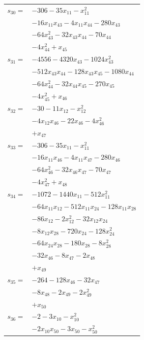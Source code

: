 \begin{longtable}{@{}r@{\;}l@{}}
\(s_{30}=\) & \(\displaystyle -306 -35x_{11} -x_{11}^{2}\) \\
 & \(\displaystyle -16x_{11}x_{43} -4x_{11}x_{44} -280x_{43}\) \\
 & \(\displaystyle -64x_{43}^{2} -32x_{43}x_{44} -70x_{44}\) \\
 & \(\displaystyle -4x_{44}^{2} +x_{45}\) \\[3pt]
\(s_{31}=\) & \(\displaystyle -4556 -4320x_{43} -1024x_{43}^{2}\) \\
 & \(\displaystyle -512x_{43}x_{44} -128x_{43}x_{45} -1080x_{44}\) \\
 & \(\displaystyle -64x_{44}^{2} -32x_{44}x_{45} -270x_{45}\) \\
 & \(\displaystyle -4x_{45}^{2} +x_{46}\) \\[3pt]
\(s_{32}=\) & \(\displaystyle -30 -11x_{12} -x_{12}^{2}\) \\
 & \(\displaystyle -4x_{12}x_{46} -22x_{46} -4x_{46}^{2}\) \\
 & \(\displaystyle +x_{47}\) \\[3pt]
\(s_{33}=\) & \(\displaystyle -306 -35x_{11} -x_{11}^{2}\) \\
 & \(\displaystyle -16x_{11}x_{46} -4x_{11}x_{47} -280x_{46}\) \\
 & \(\displaystyle -64x_{46}^{2} -32x_{46}x_{47} -70x_{47}\) \\
 & \(\displaystyle -4x_{47}^{2} +x_{48}\) \\[3pt]
\(s_{34}=\) & \(\displaystyle -1072 -1440x_{11} -512x_{11}^{2}\) \\
 & \(\displaystyle -64x_{11}x_{12} -512x_{11}x_{24} -128x_{11}x_{28}\) \\
 & \(\displaystyle -86x_{12} -2x_{12}^{2} -32x_{12}x_{24}\) \\
 & \(\displaystyle -8x_{12}x_{28} -720x_{24} -128x_{24}^{2}\) \\
 & \(\displaystyle -64x_{24}x_{28} -180x_{28} -8x_{28}^{2}\) \\
 & \(\displaystyle -32x_{46} -8x_{47} -2x_{48}\) \\
 & \(\displaystyle +x_{49}\) \\[3pt]
\(s_{35}=\) & \(\displaystyle -264 -128x_{46} -32x_{47}\) \\
 & \(\displaystyle -8x_{48} -2x_{49} -2x_{49}^{2}\) \\
 & \(\displaystyle +x_{50}\) \\[3pt]
\(s_{36}=\) & \(\displaystyle -2 -3x_{10} -x_{10}^{2}\) \\
 & \(\displaystyle -2x_{10}x_{50} -3x_{50} -x_{50}^{2}\) \\

\end{longtable}
